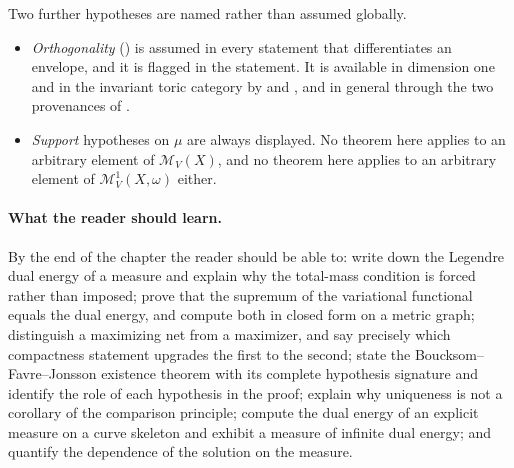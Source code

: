 Two further hypotheses are named rather than assumed globally.

\begin{itemize}
\item \emph{Orthogonality} () is assumed in
every statement that differentiates an envelope, and it is flagged in the
statement.  It is available in dimension one and in the invariant toric
category by  and
, and in general through the two
provenances of .
\item \emph{Support} hypotheses on $\mu$ are always displayed.  No theorem
here applies to an arbitrary element of $\mathcal M_V(X)$, and no theorem
here applies to an arbitrary element of $\mathcal M^1_V(X,\omega)$ either.
\end{itemize}

\paragraph{What the reader should learn.}
By the end of the chapter the reader should be able to: write down the
Legendre dual energy of a measure and explain why the total-mass condition
is forced rather than imposed; prove that the supremum of the variational
functional equals the dual energy, and compute both in closed form on a
metric graph; distinguish a maximizing net from a maximizer, and say
precisely which compactness statement upgrades the first to the second;
state the Boucksom--Favre--Jonsson existence theorem with its complete
hypothesis signature and identify the role of each hypothesis in the proof;
explain why uniqueness is not a corollary of the comparison principle;
compute the dual energy of an explicit measure on a curve skeleton and
exhibit a measure of infinite dual energy; and quantify the dependence of
the solution on the measure.

